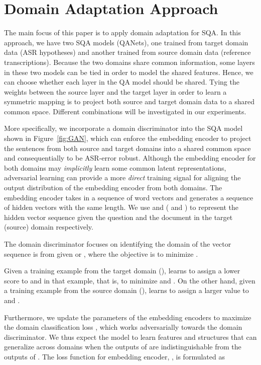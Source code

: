 \documentclass{article}
\begin{document}
\section{Domain Adaptation Approach}
\label{sec:pagestyle}
The main focus of this paper is to apply domain adaptation for SQA.
In this approach, we have two SQA models (QANets), one trained from  target domain data (ASR hypotheses) and another trained from source domain data (reference transcriptions).
Because the two domains share common information, some layers in these two models can be tied in order to model the shared features. 
Hence, we can choose whether each layer in the QA model should be shared. 
Tying the weights between the source layer and the target layer in order to learn a symmetric mapping is to project both source and target domain data to a shared common space. 
Different combinations will be investigated in our experiments.

More specifically, we incorporate a domain discriminator into the SQA model shown in Figure~\ref{fig:GAN}, which can enforce the embedding encoder to project the sentences from both source and target domains into a shared common space and consequentially to be ASR-error robust.
Although the embedding encoder for both domains may \emph{implicitly} learn some common latent representations,  adversarial learning can provide a more \emph{direct} training signal for aligning the output distribution of the embedding encoder  from both domains.
The embedding encoder takes in a sequence of word vectors and generates a sequence of hidden vectors with the same length.
We use  and  ( and ) to represent the hidden vector sequence given the question  and the document  in the target (source) domain respectively.

The domain discriminator  focuses on identifying the domain of the vector sequence is from given  or , where the objective is to minimize .

Given a training example from the target domain (),  learns to assign a lower score to  and  in that example, that is, to minimize  and .  
On the other hand, given a training example from the source domain (),  learns to assign a larger value to  and .

Furthermore, we update the parameters of the embedding encoders to maximize the domain classification loss , which works adversarially towards the domain discriminator. 
We thus expect the model to learn features and structures that can generalize across domains when the outputs of  are indistinguishable from the outputs of . 
The loss function for embedding encoder, , is formulated as
\end{document}
